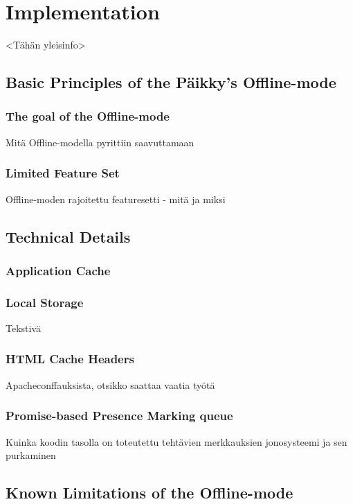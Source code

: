 
\chapter{Implementation}
<Tähän yleisinfo>


\section{Basic Principles of the Päikky's Offline-mode}
\subsection{The goal of the Offline-mode}
Mitä Offline-modella pyrittiin saavuttamaan

\subsection{Limited Feature Set}
Offline-moden rajoitettu featuresetti - mitä ja miksi


\section{Technical Details}
\subsection{Application Cache}


\subsection{Local Storage}
Tekstivä


\subsection{HTML Cache Headers}
Apacheconffauksista, otsikko saattaa vaatia työtä


\subsection{Promise-based Presence Marking queue}
Kuinka koodin tasolla on toteutettu tehtävien merkkauksien jonosysteemi ja sen purkaminen


\section{Known Limitations of the Offline-mode}



